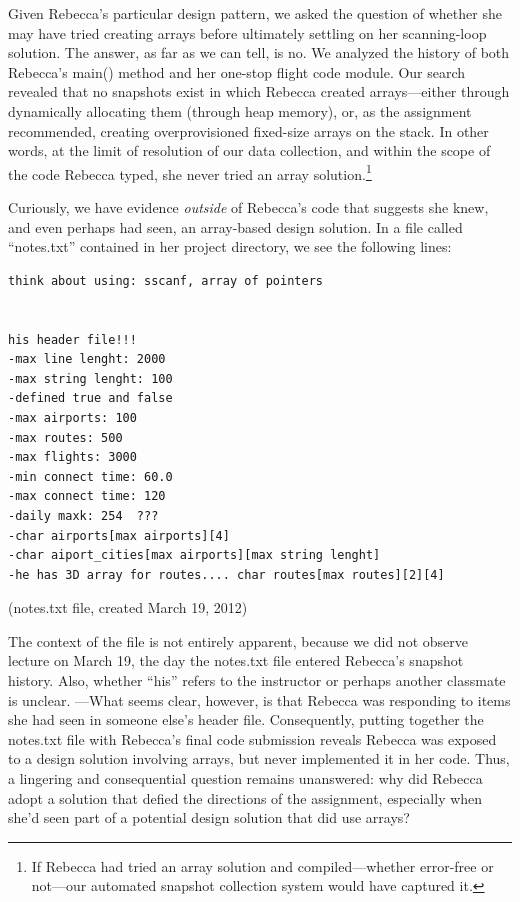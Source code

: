 Given Rebecca's particular design pattern, we asked the question of whether she may have tried creating arrays before ultimately settling on her scanning-loop solution. The answer, as far as we can tell, is no. We analyzed the history of both Rebecca's main() method and her one-stop flight code module. Our search revealed that no snapshots exist in which Rebecca created arrays---either through dynamically allocating them (through heap memory), or, as the assignment recommended, creating overprovisioned fixed-size arrays on the stack. In other words, at the limit of resolution of our data collection, and within the scope of the code Rebecca typed, she never tried an array solution.\footnote{If Rebecca had tried an array solution and compiled---whether error-free or not---our automated snapshot collection system would have captured it.}

Curiously, we have evidence \emph{outside} of Rebecca's code that suggests she knew, and even perhaps had seen, an array-based design solution. In a file called ``notes.txt'' contained in her project directory, we see the following lines:

\begin{verbatim}
think about using: sscanf, array of pointers


his header file!!!
-max line lenght: 2000
-max string lenght: 100
-defined true and false
-max airports: 100
-max routes: 500
-max flights: 3000
-min connect time: 60.0
-max connect time: 120
-daily maxk: 254  ???
-char airports[max airports][4]
-char aiport_cities[max airports][max string lenght]
-he has 3D array for routes.... char routes[max routes][2][4]
\end{verbatim}

(notes.txt file, created March 19, 2012)

The context of the file is not entirely apparent, because we did not observe lecture on March 19, the day the notes.txt file entered Rebecca's snapshot history. Also, whether ``his'' refers to the instructor or perhaps another classmate is unclear. ---What seems clear, however, is that Rebecca was responding to items she had seen in someone else's header file. Consequently, putting together the notes.txt file with Rebecca's final code submission reveals Rebecca was exposed to a design solution involving arrays, but never implemented it in her code. Thus, a lingering and consequential question remains unanswered: why did Rebecca adopt a solution that defied the directions of the assignment, especially when she'd seen part of a potential design solution that did use arrays?

